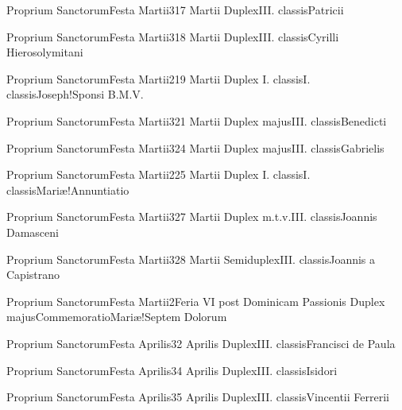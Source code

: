 \documentclass[psalterium-feriale.tex]{subfiles}
\begin{document}
	{Proprium Sanctorum}{Festa Martii}{3}{17 Martii}
	{Duplex}{III. classis}{Patricii}
	{}
	{}
\COPObRubric

	{Proprium Sanctorum}{Festa Martii}{3}{18 Martii}
	{Duplex}{III. classis}{Cyrilli Hierosolymitani}
	{}
	{}
\COPOcRubric

	{Proprium Sanctorum}{Festa Martii}{2}{19 Martii}
	{Duplex I. classis}{I. classis}{Joseph!Sponsi B.M.V.}
	{}
	{}
\psalmodiapropria

	{Proprium Sanctorum}{Festa Martii}{3}{21 Martii}
	{Duplex majus}{III. classis}{Benedicti}
	{}
	{}
\COPOcRubric

	{Proprium Sanctorum}{Festa Martii}{3}{24 Martii}
	{Duplex majus}{III. classis}{Gabrielis}
	{}
	{}
\psalmodiapropria

	{Proprium Sanctorum}{Festa Martii}{2}{25 Martii}
	{Duplex I. classis}{I. classis}{Mariæ!Annuntiatio}
	{}
	{}
\psalmodiapropria

	{Proprium Sanctorum}{Festa Martii}{3}{27 Martii}
	{Duplex m.t.v.}{III. classis}{Joannis Damasceni}
	{}
	{}
\COPObRubric

	{Proprium Sanctorum}{Festa Martii}{3}{28 Martii}
	{Semiduplex}{III. classis}{Joannis a Capistrano}
	{}
	{}
\COPOaRubric

	{Proprium Sanctorum}{Festa Martii}{2}{Feria VI post Dominicam Passionis}
	{Duplex majus}{Commemoratio}{Mariæ!Septem Dolorum}
	{}
	{}
\psalmodiapropria

	{Proprium Sanctorum}{Festa Aprilis}{3}{2 Aprilis}
	{Duplex}{III. classis}{Francisci de Paula}
	{}
	{}
\COPObdRubric

	{Proprium Sanctorum}{Festa Aprilis}{3}{4 Aprilis}
	{Duplex}{III. classis}{Isidori}
	{}
	{}
\COPOcdRubric

	{Proprium Sanctorum}{Festa Aprilis}{3}{5 Aprilis}
	{Duplex}{III. classis}{Vincentii Ferrerii}
	{}
	{}
\COPObdRubric
\end{document}
